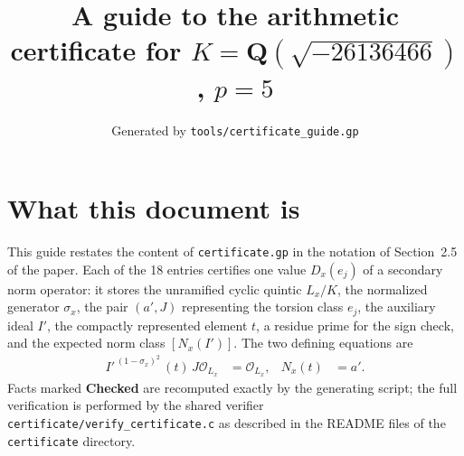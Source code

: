 \documentclass[11pt]{article}
\title{A guide to the arithmetic certificate for $K=\mathbf Q(\sqrt{-26136466})$, $p=5$}
\author{}
\date{Generated by \texttt{tools/certificate\_guide.gp}}
\begin{document}
\maketitle
\section*{What this document is}
This guide restates the content of \texttt{certificate.gp} in the
notation of Section~2.5 of the paper.  Each of the 18 entries
certifies one value $D_x(e_j)$ of a secondary norm operator: it
stores the unramified cyclic quintic $L_x/K$, the normalized
generator $\sigma_x$, the pair $(a',J)$ representing the torsion
class $e_j$, the auxiliary ideal $I'$, the compactly represented
element $t$, a residue prime for the sign check, and the expected
norm class $[N_x(I')]$.  The two defining equations are
\begin{align*}
I'^{\,(1-\sigma_x)^2}\,(t)\,J\mathcal O_{L_x}&=\mathcal O_{L_x},&
N_x(t)&=a'.
\end{align*}
Facts marked \textbf{Checked} are recomputed exactly by the
generating script; the full verification is performed by the
shared verifier \texttt{certificate/verify\_certificate.c} as
described in the README files of the \texttt{certificate}
directory.
\end{document}

